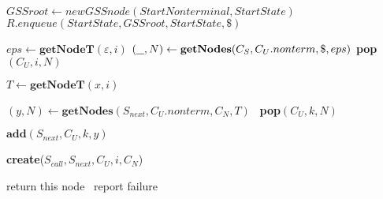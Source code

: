 \begin{algorithmic}
    \State $GSSroot\gets new GSSnode(StartNonterminal,StartState) $
    \State $R.enqueue(StartState, GSSroot, StartState, \$)$
    
    \State $eps \gets \textbf{getNodeT}(\varepsilon, i)$  
    \State $(\underline{\hspace{0.25cm}}, N) \gets \textbf{getNodes}(C_{S},C_{U}.nonterm, \$, eps)$
    \State \textbf{pop}$(C_{U},i,N)$
    \EndIf
    
            \State $T \gets \textbf{getNodeT}(x, i)$
            
            \State $(y, N) \gets \textbf{getNodes}(S_{next},C_{U}.nonterm, C_{N}, T)$
                \ \textbf{pop}$(C_{U},k,N)$ 
            \EndIf
            
            \State $\textbf{add}(S_{next}, C_{U}, k, y)$
            \EndFor
        \EndCase
    
            \State \textbf{create}($S_{call}, S_{next}, C_{U}, i, C_{N}$)
        \EndCase
        \EndSwitch
        
    \EndFor
    \EndWhile
    \State return this node
    \Else
    \ report failure
    \EndIf
\EndFunction
\end{algorithmic}
